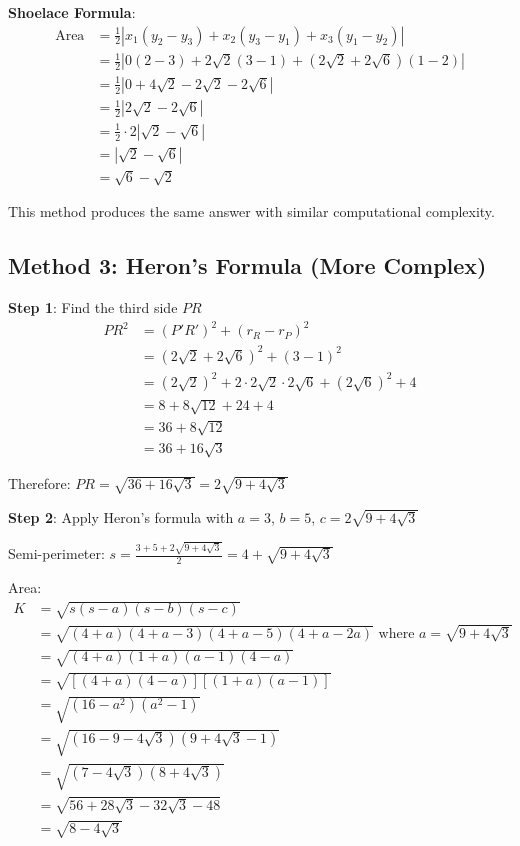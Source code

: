 \documentclass[]{article}
\begin{document}
\textbf{Shoelace Formula}:
\begin{align*}
\text{Area} &= \frac{1}{2}|x_1(y_2-y_3) + x_2(y_3-y_1) + x_3(y_1-y_2)|\\
&= \frac{1}{2}|0(2-3) + 2\sqrt{2}(3-1) + (2\sqrt{2}+2\sqrt{6})(1-2)|\\
&= \frac{1}{2}|0 + 4\sqrt{2} - 2\sqrt{2} - 2\sqrt{6}|\\
&= \frac{1}{2}|2\sqrt{2} - 2\sqrt{6}|\\
&= \frac{1}{2} \cdot 2|\sqrt{2} - \sqrt{6}|\\
&= |\sqrt{2} - \sqrt{6}|\\
&= \sqrt{6} - \sqrt{2}
\end{align*}

This method produces the same answer with similar computational complexity.

\subsection*{Method 3: Heron's Formula (More Complex)}

\textbf{Step 1}: Find the third side $PR$
\begin{align*}
PR^2 &= (P'R')^2 + (r_R - r_P)^2\\
&= (2\sqrt{2} + 2\sqrt{6})^2 + (3-1)^2\\
&= (2\sqrt{2})^2 + 2 \cdot 2\sqrt{2} \cdot 2\sqrt{6} + (2\sqrt{6})^2 + 4\\
&= 8 + 8\sqrt{12} + 24 + 4\\
&= 36 + 8\sqrt{12}\\
&= 36 + 16\sqrt{3}
\end{align*}

Therefore: $PR = \sqrt{36 + 16\sqrt{3}} = 2\sqrt{9 + 4\sqrt{3}}$

\textbf{Step 2}: Apply Heron's formula with $a=3$, $b=5$, $c=2\sqrt{9+4\sqrt{3}}$

Semi-perimeter: $s = \frac{3 + 5 + 2\sqrt{9+4\sqrt{3}}}{2} = 4 + \sqrt{9+4\sqrt{3}}$

Area:
\begin{align*}
K &= \sqrt{s(s-a)(s-b)(s-c)}\\
&= \sqrt{(4+a)(4+a-3)(4+a-5)(4+a-2a)} \text{ where } a = \sqrt{9+4\sqrt{3}}\\
&= \sqrt{(4+a)(1+a)(a-1)(4-a)}\\
&= \sqrt{[(4+a)(4-a)][(1+a)(a-1)]}\\
&= \sqrt{(16-a^2)(a^2-1)}\\
&= \sqrt{(16-9-4\sqrt{3})(9+4\sqrt{3}-1)}\\
&= \sqrt{(7-4\sqrt{3})(8+4\sqrt{3})}\\
&= \sqrt{56 + 28\sqrt{3} - 32\sqrt{3} - 48}\\
&= \sqrt{8 - 4\sqrt{3}}
\end{align*}
\end{document}
